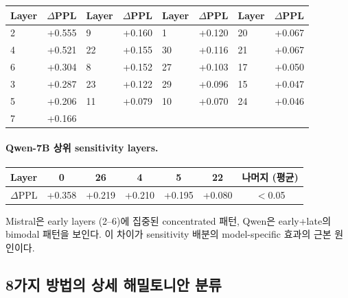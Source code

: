 \begin{center}
\small
\begin{tabular}{@{}lr|lr|lr|lr@{}}
\toprule
Layer & $\Delta$PPL & Layer & $\Delta$PPL & Layer & $\Delta$PPL & Layer & $\Delta$PPL \\
\midrule
2 & +0.555 & 9 & +0.160 & 1 & +0.120 & 20 & +0.067 \\
4 & +0.521 & 22 & +0.155 & 30 & +0.116 & 21 & +0.067 \\
6 & +0.304 & 8 & +0.152 & 27 & +0.103 & 17 & +0.050 \\
3 & +0.287 & 23 & +0.122 & 29 & +0.096 & 15 & +0.047 \\
5 & +0.206 & 11 & +0.079 & 10 & +0.070 & 24 & +0.046 \\
7 & +0.166 &  &  &  &  &  & \\
\bottomrule
\end{tabular}
\end{center}

\paragraph{Qwen-7B 상위 sensitivity layers.}

\begin{center}
\small
\begin{tabular}{@{}lcccccc@{}}
\toprule
Layer & 0 & 26 & 4 & 5 & 22 & 나머지 (평균) \\
\midrule
$\Delta$PPL & +0.358 & +0.219 & +0.210 & +0.195 & +0.080 & $<$0.05 \\
\bottomrule
\end{tabular}
\end{center}

Mistral은 early layers (2--6)에 집중된 concentrated 패턴, Qwen은 early+late의 bimodal 패턴을 보인다. 이 차이가 sensitivity 배분의 model-specific 효과의 근본 원인이다.

\subsection{8가지 방법의 상세 해밀토니안 분류}
\label{sec:full_classification}

